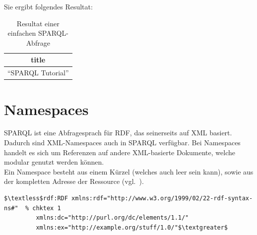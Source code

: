 Sie ergibt folgendes Resultat:
\noindent\hspace*{15mm}
\begin{table}[h]
    \centering
    \begin{tabular}{|l|}
        \hline
        \multicolumn{1}{|c|}{\textbf{title}} \\ \hline
        ``SPARQL Tutorial''                    \\ \hline
    \end{tabular}
    \caption{Resultat einer einfachen SPARQL-Abfrage\protect\footnotemark}
\end{table}

\section{Namespaces}
\label{sec:sparql_namespaces}

SPARQL ist eine Abfragesprach für RDF, das seinerseits auf XML basiert. Dadurch sind XML-Namespaces auch in SPARQL verfügbar. Bei Namespaces handelt es sich um Referenzen auf andere XML-basierte Dokumente, welche modular genutzt werden können.\\
Ein Namespace besteht aus einem Kürzel (welches auch leer sein kann), sowie aus der kompletten Adresse der Ressource (vgl.~\cite[2.1 Introduction]{w3rdf_syntax}).

\begin{lstlisting}
$\textless$rdf:RDF xmlns:rdf="http://www.w3.org/1999/02/22-rdf-syntax-ns#"  % chktex 1
         xmlns:dc="http://purl.org/dc/elements/1.1/"
         xmlns:ex="http://example.org/stuff/1.0/"$\textgreater$
\end{lstlisting}

